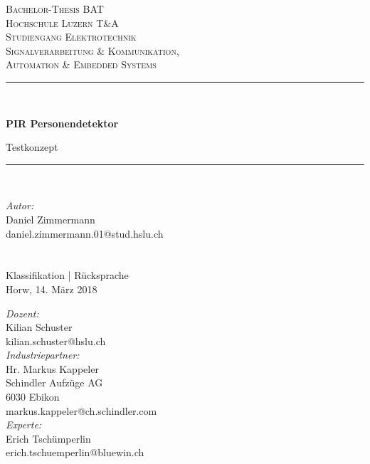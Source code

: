 \begin{titlepage}	
	\begin{center}	
		  
		\textsc{\LARGE Bachelor-Thesis BAT }\\[1.0cm]
		
		\textsc{\Large Hochschule Luzern T\&A}\\[0.5cm]
		
		\textsc{Studiengang Elektrotechnik}\\[0.2cm]
		
		\textsc{	Signalverarbeitung \& Kommunikation, \\
			Automation \& Embedded Systems}\\[0.5cm]
		
		\newcommand{\HRule}{\rule{\linewidth}{0.5mm}}
		\HRule \\[0.4cm]
		{   \Huge \bfseries PIR Personendetektor\\
			\large \vspace{\baselineskip}
			
			\large Testkonzept\\[0.2cm]
			
			\HRule \\[1cm]
			\large \vspace{\baselineskip}
		}
	\begingroup
	\parfillskip=0pt
	\large
	
	\begin{minipage}[t]{0.48\textwidth}
		\raggedright						
		\emph{Autor:}\\
		Daniel Zimmermann\\
		daniel.zimmermann.01@stud.hslu.ch\\
		\hfill \break
		\\[2.65cm]
		\hfill \break
		\\[0.5cm]
		{\large Klassifikation | Rücksprache\\ 
			Horw, 
			14. März 2018}
	\end{minipage}%
	\hfill
	\begin{minipage}[t]{0.48\textwidth}
		\raggedleft
		\emph{Dozent:} \\
		Kilian Schuster \\
		kilian.schuster@hslu.ch\\
		\hfill\break
		\emph{Industriepartner:} \\
		Hr. Markus Kappeler \\
		Schindler Aufzüge AG \\
		6030 Ebikon\\
		markus.kappeler@ch.schindler.com\\
		\hfill\break
		\emph{Experte:}\\
		Erich Tschümperlin\\
		erich.tschuemperlin@bluewin.ch\\
	\end{minipage}%
	\par\endgroup
			\hfill
		
	\end{center}	
\end{titlepage}
